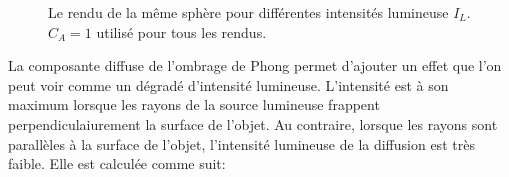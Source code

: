 \documentclass[11pt]{article}
\begin{document}
\begin{figure}[h!]

	\caption{Le rendu de la même sphère pour différentes intensités lumineuse $I_L$. $C_A = 1$ utilisé pour tous les rendus.}
	\label{differentAmbient}
\end{figure}
\FloatBarrier

La composante diffuse de l'ombrage de Phong permet d'ajouter un effet que l'on peut voir comme un dégradé d'intensité lumineuse. L'intensité est à son maximum lorsque les rayons de la source lumineuse frappent perpendiculaiurement la surface de l'objet. Au contraire, lorsque les rayons sont parallèles à la surface de l'objet, l'intensité lumineuse de la diffusion est très faible. Elle est calculée comme suit:\\
\end{document}
